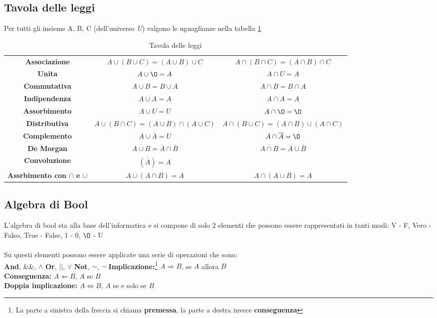 \vspace{-5pt}
\subsection{Tavola delle leggi}
Per tutti gli insieme A, B, C (dell'universo \textit{U}) valgono le uguaglianze nella tabella \ref{tab:leggi-insiemi}
\begin{table}[h!]
    \centering
    \setlength{\tabcolsep}{8pt}
    \renewcommand{\arraystretch}{2}
    \begin{tabular}{|c|c c|}
        \hline
        \textbf{Associazione} & $A \cup (B \cup C) = (A \cup B) \cup C$ & $A \cap (B \cap C) = (A \cap B) \cap C$ \\
        \textbf{Unita} & $A \cup \O = A$ & $A \cap U = A$ \\
        \textbf{Commutativa} & $A \cup B = B \cup A$ & $A \cap B = B \cap A$ \\
        \textbf{Indipendenza} & $A \cup A = A$ & $A \cap A = A$ \\
        \textbf{Assorbimento} & $A \cup U = U$ & $A \cap \O = \O$ \\
        \textbf{Distributiva} & $A \cup (B \cap C) = (A \cup B) \cap (A \cup C)$ & $A \cap (B \cup C) = (A \cap B) \cup (A \cap C)$ \\
        \textbf{Complemento} & $A \cup \overline{A} = U$ & $A \cap \overline{A} = \O$ \\
        \textbf{De Morgan} & $\overline{A \cup B} = \overline{A} \cap \overline{B}$ & $\overline{A \cap B} = \overline{A} \cup \overline{B}$ \\
        \textbf{Convoluzione} & $\overline{(\overline{A})} = A$ &  \\
        \textbf{Assrbimento con $\cap$ e $\cup$} & $A \cup (A \cap B) = A$ & $A \cap (A \cup B) = A$ \\
        \hline
    \end{tabular}
    \caption{Tavola delle leggi}
    \label{tab:leggi-insiemi}
\end{table}

\newpage
\subsection{Algebra di Bool}
L'algebra di bool sta alla base dell'informatica e si compone di solo 2 elementi che possono essere rappresentati in tanti modi: V - F, Vero - Falso, True - False, 1 - 0, $\O$ - U \\ \\
Su questi elementi possono essere applicate una serie di operazioni che sono: \\
\textbf{And}, \&\&, $\land$ \hspace{.3cm} \textbf{Or}, $||$, $\lor$ \hspace{.3cm} \textbf{Not}, $\sim$, $\lnot$
\textbf{Implicazione:}\footnote{La parte a sinistra della freccia si chiama \textbf{premessa}, la parte a destra invece \textbf{conseguenza}} $A \Longrightarrow B$, se $A$ allora $B$ \\
\textbf{Conseguenza:} $A \Longleftarrow B$, $A$ se $B$ \\ 
\textbf{Doppia implicazione:} $A \iff B$, $A$ se e solo se $B$

